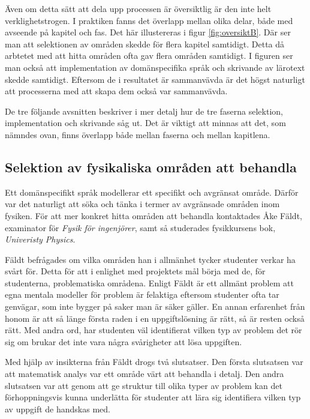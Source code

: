 \begin{binge}
Även om detta sätt att dela upp processen är översiktlig är den inte helt
verklighetstrogen. I praktiken fanns det överlapp mellan olika delar, både med
avseende på kapitel och fas. Det här illustereras i figur \ref{fig:oversiktB}.
Där ser man att selektionen av områden skedde för flera kapitel samtidigt.
Detta då arbtetet med att hitta områden ofta gav flera områden samtidigt. I
figuren ser man också att implementation av domänspecifika språk och skrivande
av lärotext skedde samtidigt. Eftersom de i resultatet är sammanvävda är det
högst naturligt att processerna med att skapa dem också var sammanvävda.

De tre följande avsnitten beskriver i mer detalj hur de tre faserna selektion,
implementation och skrivande såg ut. Det är viktigt att minnas att det, som
nämndes ovan, finns överlapp både mellan faserna och mellan kapitlena.

\subsection{Selektion av fysikaliska områden att behandla}
\label{sec:selektion}

Ett domänspecifikt språk modellerar ett specifikt och avgränsat område. Därför
var det naturligt att söka och tänka i termer av avgränsade områden inom
fysiken. För att mer konkret hitta områden att behandla kontaktades Åke Fäldt,
examinator för \textit{Fysik för ingenjörer}, samt så studerades fysikkursens
bok, \textit{Univeristy Physics}.

Fäldt befrågades om vilka områden han i allmänhet tycker studenter verkar ha
svårt för. Detta för att i enlighet med projektets mål börja med de, för
studenterna, problematiska områdena. Enligt Fäldt är ett allmänt problem att
egna mentala modeller för problem är felaktiga eftersom studenter ofta tar
genvägar, som inte bygger på saker man är säker gäller. En annan erfarenhet
från honom är att så länge första raden i en uppgiftslösning är rätt, så är
resten också rätt. Med andra ord, har studenten väl identifierat vilken typ av
problem det rör sig om brukar det inte vara några svårigheter att lösa
uppgiften.

Med hjälp av insikterna från Fäldt drogs två slutsatser. Den första slutsatsen
var att matematisk analys var ett område värt att behandla i detalj. Den andra
slutsatsen var att genom att ge struktur till olika typer av problem kan det
förhoppningsvis kunna underlätta för studenter att lära sig identifiera vilken
typ av uppgift de handskas med.


\end{binge}
